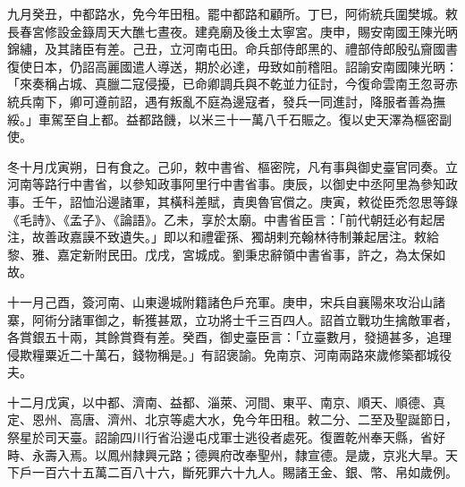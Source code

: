 \begin{pinyinscope}
 九月癸丑，中都路水，免今年田租。罷中都路和顧所。丁巳，阿術統兵圍樊城。敕長春宮修設金籙周天大醮七晝夜。建堯廟及後土太寧宮。庚申，賜安南國王陳光昞錦繡，及其諸臣有差。己丑，立河南屯田。命兵部侍郎黑的、禮部侍郎殷弘齎國書復使日本，仍詔高麗國遣人導送，期於必達，毋致如前稽阻。詔諭安南國陳光昞：「來奏稱占城、真臘二寇侵擾，已命卿調兵與不乾並力征討，今復命雲南王忽哥赤統兵南下，卿可遵前詔，遇有叛亂不庭為邊寇者，發兵一同進討，降服者善為撫綏。」車駕至自上都。益都路饑，以米三十一萬八千石賑之。復以史天澤為樞密副使。



 冬十月戊寅朔，日有食之。己卯，敕中書省、樞密院，凡有事與御史臺官同奏。立河南等路行中書省，以參知政事阿里行中書省事。庚辰，以御史中丞阿里為參知政事。壬午，詔恤沿邊諸軍，其橫科差賦，責奧魯官償之。庚寅，敕從臣禿忽思等錄《毛詩》、《孟子》、《論語》。乙未，享於太廟。中書省臣言：「前代朝廷必有起居注，故善政嘉謨不致遺失。」即以和禮霍孫、獨胡剌充翰林待制兼起居注。敕給黎、雅、嘉定新附民田。戊戌，宮城成。劉秉忠辭領中書省事，許之，為太保如故。



 十一月己酉，簽河南、山東邊城附籍諸色戶充軍。庚申，宋兵自襄陽來攻沿山諸寨，阿術分諸軍御之，斬獲甚眾，立功將士千三百四人。詔首立戰功生擒敵軍者，各賞銀五十兩，其餘賞賚有差。癸酉，御史臺臣言：「立臺數月，發擿甚多，追理侵欺糧粟近二十萬石，錢物稱是。」有詔褒諭。免南京、河南兩路來歲修築都城役夫。



 十二月戊寅，以中都、濟南、益都、淄萊、河間、東平、南京、順天、順德、真定、恩州、高唐、濟州、北京等處大水，免今年田租。敕二分、二至及聖誕節日，祭星於司天臺。詔諭四川行省沿邊屯戍軍士逃役者處死。復置乾州奉天縣，省好畤、永壽入焉。以鳳州隸興元路；德興府改奉聖州，隸宣德。是歲，京兆大旱。天下戶一百六十五萬二百八十六，斷死罪六十九人。賜諸王金、銀、幣、帛如歲例。




\end{pinyinscope}
